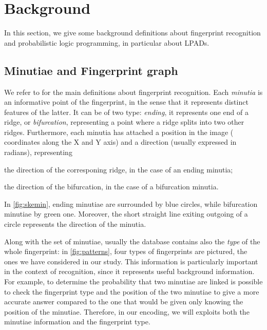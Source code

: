 \documentclass[8pt]{article}
\begin{document}
\section{Background}
\label{sec:background}
In this section, we give some background definitions about fingerprint
recognition and probabilistic logic programming, in particular about LPADs.

\subsection{Minutiae and Fingerprint graph}
\label{sub:backfinger}
We refer to \cite{maltoni2009handbook} for the main definitions about
fingerprint recognition.  Each \emph{minutia} is an informative point of the
fingerprint, in the sense that it represents distinct features of the latter.
It can be of two type: \emph{ending}, \ie it represents one end of a ridge, or
\emph{bifurcation}, representing a point where a ridge splits into two other
ridges.  Furthermore, each minutia has attached a position in the image (\ie
coordinates along the X and Y axis) and a direction (usually expressed in
radians), representing 
\begin{enumerate*}[label=\roman*)]
  \item the direction of the corresponing ridge, in the case of an ending
        minutia;
  \item the direction of the bifurcation, in the case of a bifurcation minutia.
\end{enumerate*}
In \cref{fig:skemin}, ending minutiae are surrounded by blue circles, while
bifurcation minutiae by green one. Moreover, the short straight line exiting
outgoing of a circle represents the direction of the minutia. 

Along with the set of minutiae, usually the database contains also the
\emph{type} of the whole fingerprint: in \cref{fig:patterns}, four
types of fingerprints are pictured, \ie the ones we have considered in our study. This information is particularly important
in the context of recognition, since it represents useful background
information.  For example, to determine the probability that two
minutiae are linked is possible to check the fingerprint type and
the position of the two minutiae to give a more accurate answer
compared to the one that would be given only knowing the position of the minutiae.
Therefore, in our encoding, we will exploits both the minutiae information and
the fingerprint type. 
    
\end{document}
